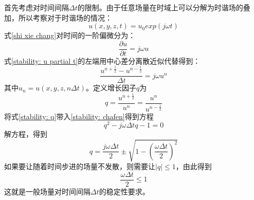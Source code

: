 首先考虑对时间间隔$\Delta t$的限制。由于任意场量在时域上可以分解为时谐场的叠加，所以考察对于时谐场的情况：
\begin{equation}\label{stability: shi xie chang}
u(x,y,z,t)=u_0exp(j\omega t)
\end{equation}
式\eqref{shi xie chang}对时间的一阶偏微分为：
\begin{equation}\label{stability: u partial t}
\frac{\partial u}{\partial t}=j\omega u
\end{equation}
式\eqref{stability: u partial t}的左端用中心差分离散近似代替得到：
\begin{equation}\label{stability: chafen}
\frac{u^{n+\frac{1}{2}}-u^{n-\frac{1}{2}}}{\Delta t}=j\omega u^n
\end{equation}
其中$u_n=u(x,y,z,n\Delta t)$。定义增长因子$q$为
\begin{equation}\label{stability: q}
	q=\frac{u^{n+\frac{1}{2}}}{u^n}=\frac{u^n}{u^{n-\frac{1}{2}}}
\end{equation}
将式\eqref{stability: q}带入\eqref{stability: chafen}得到方程
\begin{equation}
q^2-j\omega \Delta tq-1=0
\end{equation}
解方程，得到
\begin{equation}
q=\frac{j\omega \Delta t}{2}\pm\sqrt{1-\left(\frac{\omega \Delta  t}{2}\right)^2}
\end{equation}
如果要让随着时间步进的场量不发散，则需要让$|q|\leqslant 1$，由此得到
\begin{equation}\label{stability: dt}
\frac{\omega \Delta t}{2}\leqslant 1
\end{equation}
这就是一般场量对时间间隔$\Delta t$的稳定性要求。


